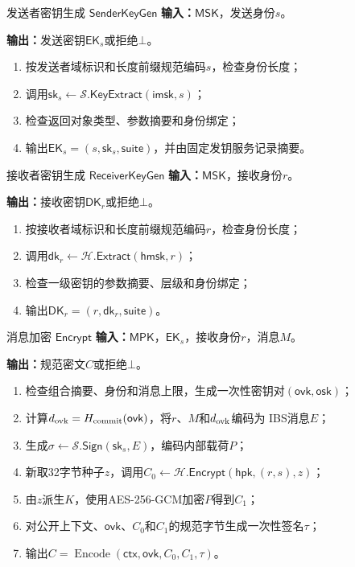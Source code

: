 \begin{ibmealgorithm}{发送者密钥生成 $\mathsf{SenderKeyGen}$}
\label{alg:sender-keygen}
\textbf{输入：}$\mathsf{MSK}$，发送身份$s$。\par
\textbf{输出：}发送密钥$\mathsf{EK}_s$或拒绝$\bot$。
\begin{enumerate}
  \item 按发送者域标识和长度前缀规范编码$s$，检查身份长度；
  \item 调用$\mathsf{sk}_s\leftarrow\mathcal S.\mathsf{KeyExtract}(\mathsf{imsk},s)$；
  \item 检查返回对象类型、参数摘要和身份绑定；
  \item 输出$\mathsf{EK}_s=(s,\mathsf{sk}_s,\mathsf{suite})$，并由固定发钥服务记录摘要。
\end{enumerate}
\end{ibmealgorithm}

\begin{ibmealgorithm}{接收者密钥生成 $\mathsf{ReceiverKeyGen}$}
\label{alg:receiver-keygen}
\textbf{输入：}$\mathsf{MSK}$，接收身份$r$。\par
\textbf{输出：}接收密钥$\mathsf{DK}_r$或拒绝$\bot$。
\begin{enumerate}
  \item 按接收者域标识和长度前缀规范编码$r$，检查身份长度；
  \item 调用$\mathsf{dk}_r\leftarrow\mathcal H.\mathsf{Extract}(\mathsf{hmsk},r)$；
  \item 检查一级密钥的参数摘要、层级和身份绑定；
  \item 输出$\mathsf{DK}_r=(r,\mathsf{dk}_r,\mathsf{suite})$。
\end{enumerate}
\end{ibmealgorithm}

\begin{ibmealgorithm}{消息加密 $\mathsf{Encrypt}$}
\label{alg:encrypt}
\textbf{输入：}$\mathsf{MPK}$，$\mathsf{EK}_s$，接收身份$r$，消息$M$。\par
\textbf{输出：}规范密文$C$或拒绝$\bot$。
\begin{enumerate}
  \item 检查组合摘要、身份和消息上限，生成一次性密钥对$(\mathsf{ovk},\mathsf{osk})$；
  \item 计算$d_{\rm ovk}=H_{\rm commit}(\mathsf{ovk})$，将$r$、$M$和$d_{\rm ovk}$编码为
        IBS消息$E$；
  \item 生成$\sigma\leftarrow\mathcal S.\mathsf{Sign}(\mathsf{sk}_s,E)$，编码内部载荷$P$；
  \item 新取32字节种子$z$，调用$C_0\leftarrow\mathcal H.\mathsf{Encrypt}
        (\mathsf{hpk},(r,s),z)$；
  \item 由$z$派生$K$，使用AES-256-GCM加密$P$得到$C_1$；
  \item 对公开上下文、$\mathsf{ovk}$、$C_0$和$C_1$的规范字节生成一次性签名$\tau$；
  \item 输出$C=\operatorname{Encode}(\mathsf{ctx},\mathsf{ovk},C_0,C_1,\tau)$。
\end{enumerate}
\end{ibmealgorithm}

